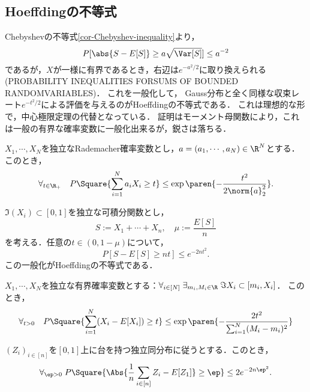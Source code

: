 \documentclass[uplatex,dvipdfmx]{jsreport}
\begin{document}
\subsection{Hoeffdingの不等式}

\begin{tcolorbox}[colframe=ForestGreen, colback=ForestGreen!10!white,breakable,colbacktitle=ForestGreen!40!white,coltitle=black,fonttitle=\bfseries\sffamily,
title=]
    Chebyshevの不等式\ref{cor-Chebyshev-inequality}より，
    \[P[\abs{S-E[S]}\ge a\sqrt{\Var[S]}]\le a^{-2}\]
    であるが，$X$が一様に有界であるとき，右辺は$e^{-a^2/2}$に取り換えられる\cite{EncyclopediaOfStatisticalScience} (PROBABILITY INEQUALITIES FORSUMS OF BOUNDED RANDOMVARIABLES)．
    これを一般化して，
    Gauss分布と全く同様な収束レート$e^{-t^2/2}$による評価を与えるのがHoeffdingの不等式である．
    これは理想的な形で，中心極限定理の代替となっている．
    証明はモーメント母関数により，これは一般の有界な確率変数に一般化出来るが，鋭さは落ちる．
\end{tcolorbox}

\begin{theorem}
    $X_1,\cdots,X_N$を独立なRademacher確率変数とし，$a=(a_1,\cdots,a_N)\in\R^N$とする．
    このとき，
    \[\forall_{t\in\R_+}\quad P\Square{\sum^N_{i=1}a_iX_i\ge t}\le\exp\paren{-\frac{t^2}{2\norm{a}^2_2}}.\]
\end{theorem}

\begin{theorem}[Bernstein]
    $\Im(X_i)\subset[0,1]$を独立な可積分関数とし，
    \[S:=X_1+\cdots+X_n,\quad\mu:=\frac{E[S]}{n}\]
    を考える．任意の$t\in(0,1-\mu)$について，
    \[P[S-E[S]\ge nt]\le e^{-2nt^2}.\]
    この一般化がHoeffdingの不等式である．
\end{theorem}

\begin{theorem}
    $X_1,\cdots,X_N$を独立な有界確率変数とする：$\forall_{i\in[N]}\;\exists_{m_i,M_i\in\R}\;\Im X_i\subset[m_i,X_i]$．
    このとき，
    \[\forall_{t>0}\quad P\Square{\sum^N_{i=1}(X_i-E[X_i])\ge t}\le\exp\paren{-\frac{2t^2}{\sum_{i=1}^N(M_i-m_i)^2}}\]
\end{theorem}
\begin{corollary}[正規化した場合]
    $(Z_i)_{i\in[n]}$を$[0,1]$上に台を持つ独立同分布に従うとする．このとき，
    \[\forall_{\ep>0}\;P\Square{\Abs{\frac{1}{n}\sum_{i\in[n]}Z_i-E[Z_1]}\ge\ep}\le 2e^{-2n\ep^2}.\]
\end{corollary}
\end{document}
